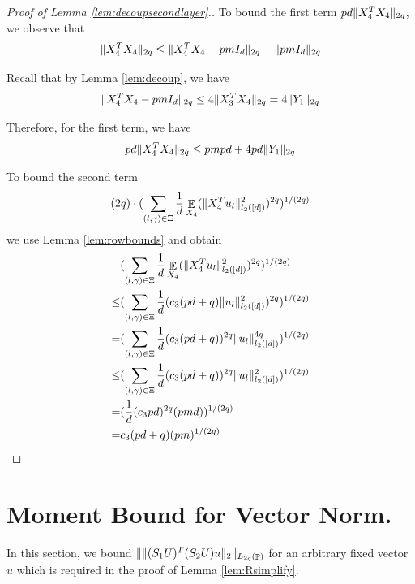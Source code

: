 \documentclass[11pt]{amsart}
\numberwithin{equation}{section}
\numberwithin{equation}{section}
\DeclareMathOperator{\E}{\mathbb{E}}
\DeclareMathOperator{\Pb}{\mathbb{P}}
\DeclarePairedDelimiter{\norm}{\lVert}{\rVert}
\begin{document}
\begin{proof}[Proof of Lemma \ref{lem:decoupsecondlayer}.]
To bound the first term $pd\norm{X_4^TX_4}_{2q}$, we observe that
\begin{align*}
\norm{X_4^TX_4}_{2q} \le \norm{X_4^TX_4-pm I_d }_{2q}+\norm{pm I_d }_{2q}
\end{align*}

Recall that by Lemma \ref{lem:decoup}, we have
\begin{align*}
    \norm{X_4^TX_4-pm I_d }_{2q} \le 4\norm{X_3^TX_4}_{2q}=4\norm{Y_1}_{2q}
\end{align*}

Therefore, for the first term, we have
\begin{align*}
    pd\norm{X_4^TX_4}_{2q} \le pmpd + 4pd\norm{Y_1}_{2q}
\end{align*}

To bound the second term
\begin{align*}
    (2q)\cdot (\sum\limits_{(l,\gamma) \in \Xi}\frac{1}{d}\E_{X_4}(\norm{X_4^Tu_l}_{l_2([d])}^{2})^{2q})^{1/(2q)}
\end{align*}
we use Lemma \ref{lem:rowbounds} and obtain
\begin{align*}
    &(\sum\limits_{(l,\gamma) \in \Xi}\frac{1}{d}\E_{X_4}(\norm{X_4^Tu_l}_{l_2([d])}^{2})^{2q})^{1/(2q)}\\ \le &(\sum\limits_{(l,\gamma) \in \Xi}\frac{1}{d}(c_3 (pd+q)\norm{u_l}_{l_2([d])}^{2})^{2q})^{1/(2q)}
    \\ = &(\sum\limits_{(l,\gamma) \in \Xi}\frac{1}{d}(c_3 (pd+q))^{2q}\norm{u_l}_{l_2([d])}^{4q})^{1/(2q)}
    \\ \le &(\sum\limits_{(l,\gamma) \in \Xi}\frac{1}{d}(c_3 (pd+q))^{2q}\norm{u_l}_{l_2([d])}^{2})^{1/(2q)}
    \\ = &(\frac{1}{d}(c_3 pd)^{2q}(pmd))^{1/(2q)}
    \\=&c_3(pd+q)(pm)^{1/(2q)}
\end{align*}



\end{proof}


\section{Moment Bound for Vector Norm.}\label{sec:vecmombd}
 

In this section, we bound $\norm{\norm{(S_1 U)^T(S_2 U)u}_2}_{L_{2q}(\Pb)}$ for an arbitrary fixed vector $u$ which is required in the proof of Lemma \ref{lem:Rsimplify}. 
\end{document}
